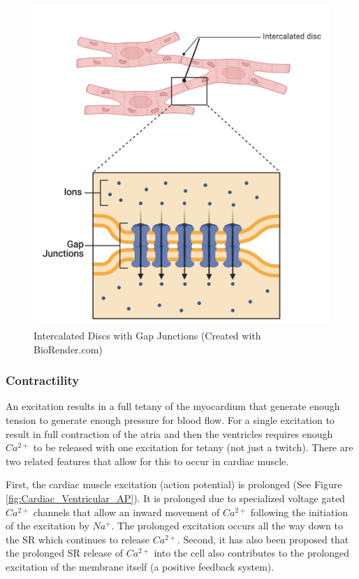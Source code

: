 \begin{figure}[!h]
    \centering
    \includegraphics[width=1\linewidth]{./figure/Cardiac_Gap_Junctions.png}
    \caption{Intercalated Discs with Gap Junctions \footnotesize{(Created with BioRender.com)}}
    \label{fig:Cardiac_Gap_Junctions}
\end{figure}

\subsubsection{Contractility}

An excitation results in a full tetany of the myocardium that generate enough tension to generate enough pressure for blood flow. For a single excitation to result in full contraction of the atria and then the ventricles requires enough $Ca^{2+}$ to be released with one excitation for tetany (not just a twitch). There are two related features that allow for this to occur in cardiac muscle. 

First, the cardiac muscle excitation (action potential) is prolonged (See Figure \ref{fig:Cardiac_Ventricular_AP}). It is prolonged due to specialized voltage gated $Ca^{2+}$ channels that allow an inward movement of $Ca^{2+}$ following the initiation of the excitation by $Na^+$. The prolonged excitation occurs all the way down to the SR which continues to release $Ca^{2+}$. Second, it has also been proposed that the prolonged SR release of $Ca^{2+}$ into the cell also contributes to the prolonged excitation of the membrane itself (a positive feedback system). 

